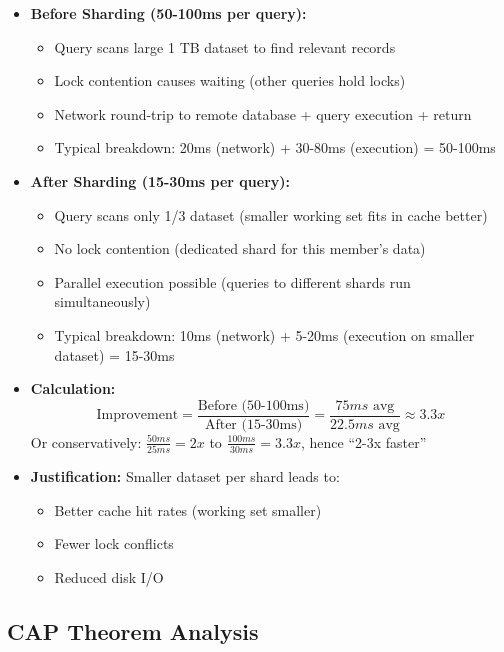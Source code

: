 \documentclass[12pt,a4paper]{article}
\begin{document}
\begin{itemize}
    \item \textbf{Before Sharding (50-100ms per query):}
    \begin{itemize}
        \item Query scans large 1 TB dataset to find relevant records
        \item Lock contention causes waiting (other queries hold locks)
        \item Network round-trip to remote database + query execution + return
        \item Typical breakdown: 20ms (network) + 30-80ms (execution) = 50-100ms
    \end{itemize}
    
    \item \textbf{After Sharding (15-30ms per query):}
    \begin{itemize}
        \item Query scans only 1/3 dataset (smaller working set fits in cache better)
        \item No lock contention (dedicated shard for this member's data)
        \item Parallel execution possible (queries to different shards run simultaneously)
        \item Typical breakdown: 10ms (network) + 5-20ms (execution on smaller dataset) = 15-30ms
    \end{itemize}
    
    \item \textbf{Calculation:}
    \[
    \text{Improvement} = \frac{\text{Before (50-100ms)}}{\text{After (15-30ms)}} = \frac{75ms \text{ avg}}{22.5ms \text{ avg}} \approx 3.3x
    \]
    Or conservatively: \(\frac{50ms}{25ms} = 2x\) to \(\frac{100ms}{30ms} = 3.3x\), hence ``2-3x faster''
    
    \item \textbf{Justification:} Smaller dataset per shard leads to:
    \begin{itemize}
        \item Better cache hit rates (working set smaller)
        \item Fewer lock conflicts
        \item Reduced disk I/O
    \end{itemize}
\end{itemize}

\subsection{CAP Theorem Analysis}
\end{document}
